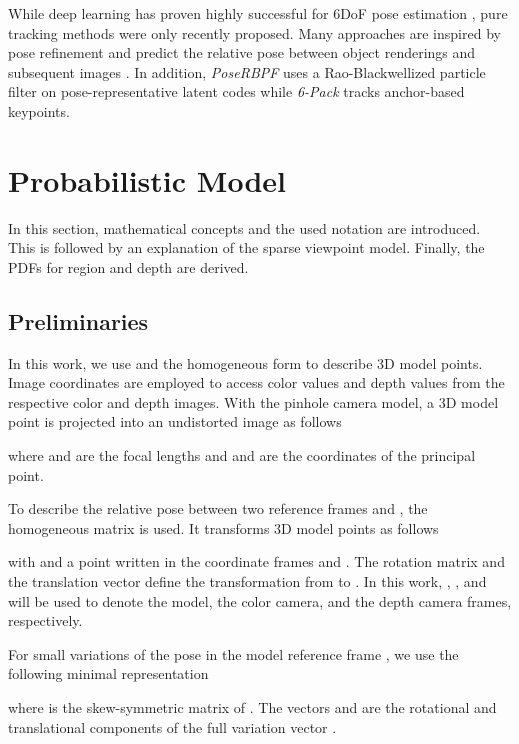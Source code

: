 \documentclass[10pt,twocolumn,letterpaper]{article}
\begin{document}
While deep learning has proven highly successful for \ac{6DoF} pose estimation \cite{Labbe2020, He2021, Wang2019b, Xiang2018, Sundermeyer2018}, pure tracking methods were only recently proposed.
Many approaches are inspired by pose refinement and predict the relative pose between object renderings and subsequent images \cite{Li2018, Manhardt2018, Wen2020}. 
In addition, \textit{PoseRBPF} \cite{Deng2021} uses a Rao-Blackwellized particle filter on pose-representative latent codes \cite{Sundermeyer2018} while \textit{6-Pack} \cite{Wang2020} tracks anchor-based keypoints.
 


\section{Probabilistic Model}\label{sec:p}
In this section, mathematical concepts and the used notation are introduced.
This is followed by an explanation of the sparse viewpoint model.
Finally, the \acp{PDF} for region and depth are derived.



\subsection{Preliminaries}\label{ssec:p0}
In this work, we use  and the homogeneous form  to describe 3D model points.
Image coordinates  are employed to access color values  and depth values  from the respective color and depth images.
With the pinhole camera model, a 3D model point is projected into an undistorted image as follows

where  and  are the focal lengths and  and  are the coordinates of the principal point.

To describe the relative pose between two reference frames  and , the homogeneous matrix  is used.
It transforms 3D model points as follows

with  and  a point written in the coordinate frames  and .
The rotation matrix  and the translation vector  define the transformation from  to .
In this work, , , and  will be used to denote the model, the color camera, and the depth camera frames, respectively.

For small variations of the pose in the model reference frame , we use the following minimal representation

where  is the skew-symmetric matrix of .
The vectors  and  are the rotational and translational components of the full variation vector .
\end{document}
